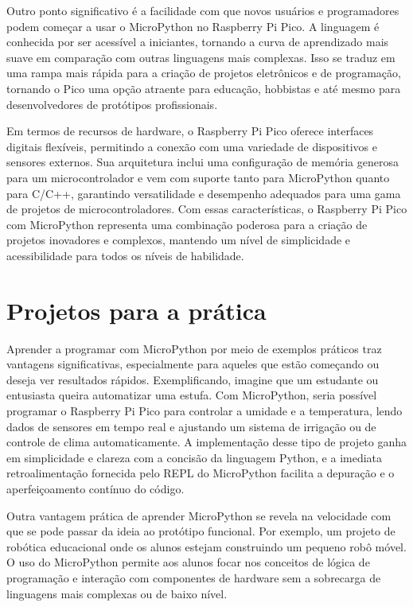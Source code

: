 \documentclass[a4paper,11pt]{article}
\begin{document}
Outro ponto significativo é a facilidade com que novos usuários e programadores podem começar a usar o MicroPython no Raspberry Pi Pico. A linguagem é conhecida por ser acessível a iniciantes, tornando a curva de aprendizado mais suave em comparação com outras linguagens mais complexas. Isso se traduz em uma rampa mais rápida para a criação de projetos eletrônicos e de programação, tornando o Pico uma opção atraente para educação, hobbistas e até mesmo para desenvolvedores de protótipos profissionais.

Em termos de recursos de hardware, o Raspberry Pi Pico oferece interfaces digitais flexíveis, permitindo a conexão com uma variedade de dispositivos e sensores externos. Sua arquitetura inclui uma configuração de memória generosa para um microcontrolador e vem com suporte tanto para MicroPython quanto para C/C++, garantindo versatilidade e desempenho adequados para uma gama de projetos de microcontroladores. Com essas características, o Raspberry Pi Pico com MicroPython representa uma combinação poderosa para a criação de projetos inovadores e complexos, mantendo um nível de simplicidade e acessibilidade para todos os níveis de habilidade.

\section{Projetos para a prática}
Aprender a programar com MicroPython por meio de exemplos práticos traz vantagens significativas, especialmente para aqueles que estão começando ou deseja ver resultados rápidos. Exemplificando, imagine que um estudante ou entusiasta queira automatizar uma estufa. Com MicroPython, seria possível programar o Raspberry Pi Pico para controlar a umidade e a temperatura, lendo dados de sensores em tempo real e ajustando um sistema de irrigação ou de controle de clima automaticamente. A implementação desse tipo de projeto ganha em simplicidade e clareza com a concisão da linguagem Python, e a imediata retroalimentação fornecida pelo REPL do MicroPython facilita a depuração e o aperfeiçoamento contínuo do código.

Outra vantagem prática de aprender MicroPython se revela na velocidade com que se pode passar da ideia ao protótipo funcional. Por exemplo, um projeto de robótica educacional onde os alunos estejam construindo um pequeno robô móvel. O uso do MicroPython permite aos alunos focar nos conceitos de lógica de programação e interação com componentes de hardware sem a sobrecarga de linguagens mais complexas ou de baixo nível. 
\end{document}
